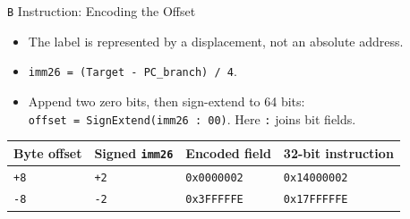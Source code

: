\documentclass[aspectratio=169,11pt,t]{beamer}
\newcommand{\code}[1]{\texttt{#1}}
\newcommand{\bfld}[5]{%
  \pgfmathsetmacro{\cx}{#1 + #3/2}%
  \fill[#5] (#1,#2) rectangle ++(#3,0.72);%
  \draw[navy,line width=0.7pt] (#1,#2) rectangle ++(#3,0.72);%
  \node[font=\scriptsize\ttfamily,text height=1.5ex,text depth=0.35ex,align=center,text=darkgray] at (\cx,#2+0.36) {#4};%
}
\begin{document}
\begin{frame}{\texttt{B} Instruction: Encoding the Offset}
\small
\begin{center}
\end{center}
\vspace{.02cm}
\begin{itemize}\setlength{\itemsep}{5pt}
  \item The label is represented by a displacement, not an absolute address.
  \item \code{imm26 = (Target - PC\_branch) / 4}.
  \item Append two zero bits, then sign-extend to 64 bits:\\
        \code{offset = SignExtend(imm26 : 00)}. Here \code{:} joins bit fields.
\end{itemize}
\vspace{.12cm}
\begin{center}
\renewcommand{\arraystretch}{1.22}
\setlength{\tabcolsep}{9pt}
\begin{tabular}{llll}
\toprule
\rowcolor{white}
\textbf{Byte offset} & \textbf{Signed \code{imm26}} & \textbf{Encoded field} & \textbf{32-bit instruction} \\
\midrule
\code{+8} & \code{+2} & \code{0x0000002} & \code{0x14000002} \\
\code{-8} & \code{-2} & \code{0x3FFFFFE} & \code{0x17FFFFFE} \\
\bottomrule
\end{tabular}
\end{center}
\end{frame}
\end{document}
